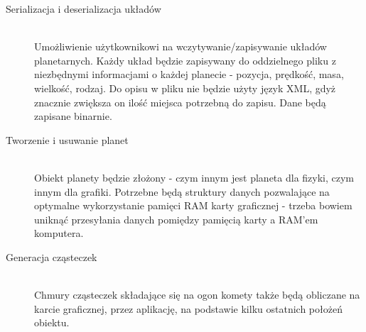 \begin{description}
	\item[Serializacja i deserializacja układów] \hfill \\
	Umożliwienie użytkownikowi na wczytywanie/zapisywanie układów planetarnych. Każdy układ będzie zapisywany do oddzielnego pliku z niezbędnymi informacjami o każdej planecie - pozycja, prędkość, masa, wielkość, rodzaj. Do opisu w pliku nie będzie użyty język XML, gdyż znacznie zwiększa on ilość miejsca potrzebną do zapisu. Dane będą zapisane binarnie.
	\item[Tworzenie i usuwanie planet] \hfill \\
	Obiekt planety będzie złożony - czym innym jest planeta dla fizyki, czym innym dla grafiki. Potrzebne będą struktury danych pozwalające na optymalne wykorzystanie pamięci RAM karty graficznej - trzeba bowiem uniknąć przesyłania danych pomiędzy pamięcią karty a RAM'em komputera.
	\item[Generacja cząsteczek] \hfill \\
	Chmury cząsteczek składające się na ogon komety także będą obliczane na karcie graficznej, przez aplikację, na podstawie kilku ostatnich położeń obiektu.
\end{description}

